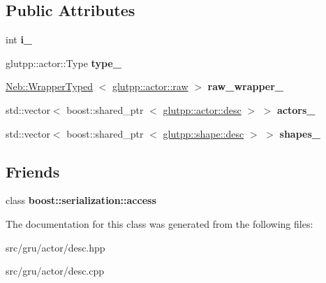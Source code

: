 \subsection*{\-Public \-Attributes}
\begin{DoxyCompactItemize}
\item 
\hypertarget{classglutpp_1_1actor_1_1desc_a381f83a4e473e77af3feca531661bab9}{int {\bfseries i\-\_\-}}\label{classglutpp_1_1actor_1_1desc_a381f83a4e473e77af3feca531661bab9}

\item 
\hypertarget{classglutpp_1_1actor_1_1desc_a60f20d1d65827270ca37c760cf885182}{glutpp\-::actor\-::\-Type {\bfseries type\-\_\-}}\label{classglutpp_1_1actor_1_1desc_a60f20d1d65827270ca37c760cf885182}

\item 
\hypertarget{classglutpp_1_1actor_1_1desc_ad1176aeb3cb0a4a3a39eed2739c7a61c}{\hyperlink{classNeb_1_1WrapperTyped}{\-Neb\-::\-Wrapper\-Typed}\*
$<$ \hyperlink{classglutpp_1_1actor_1_1raw}{glutpp\-::actor\-::raw} $>$ {\bfseries raw\-\_\-wrapper\-\_\-}}\label{classglutpp_1_1actor_1_1desc_ad1176aeb3cb0a4a3a39eed2739c7a61c}

\item 
\hypertarget{classglutpp_1_1actor_1_1desc_ac232d70e46d846c8c4890ff63798b1d7}{std\-::vector$<$ boost\-::shared\-\_\-ptr\*
$<$ \hyperlink{classglutpp_1_1actor_1_1desc}{glutpp\-::actor\-::desc} $>$ $>$ {\bfseries actors\-\_\-}}\label{classglutpp_1_1actor_1_1desc_ac232d70e46d846c8c4890ff63798b1d7}

\item 
\hypertarget{classglutpp_1_1actor_1_1desc_a89da576b19f6a8cc5efb640a70a6c42f}{std\-::vector$<$ boost\-::shared\-\_\-ptr\*
$<$ \hyperlink{classglutpp_1_1shape_1_1desc}{glutpp\-::shape\-::desc} $>$ $>$ {\bfseries shapes\-\_\-}}\label{classglutpp_1_1actor_1_1desc_a89da576b19f6a8cc5efb640a70a6c42f}

\end{DoxyCompactItemize}
\subsection*{\-Friends}
\begin{DoxyCompactItemize}
\item 
\hypertarget{classglutpp_1_1actor_1_1desc_ac98d07dd8f7b70e16ccb9a01abf56b9c}{class {\bfseries boost\-::serialization\-::access}}\label{classglutpp_1_1actor_1_1desc_ac98d07dd8f7b70e16ccb9a01abf56b9c}

\end{DoxyCompactItemize}


\-The documentation for this class was generated from the following files\-:\begin{DoxyCompactItemize}
\item 
src/gru/actor/desc.\-hpp\item 
src/gru/actor/desc.\-cpp\end{DoxyCompactItemize}
